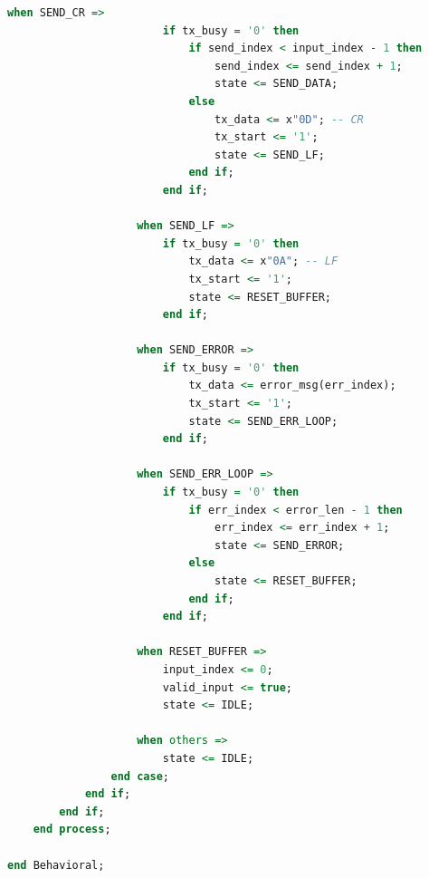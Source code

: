 \documentclass[a4paper,12pt]{article}
\begin{document}
\begin{lstlisting}[language=VHDL, caption={Código completo del módulo UART\_ECHO}, label={lst:uart_echo}]
                    when SEND_CR =>
                        if tx_busy = '0' then
                            if send_index < input_index - 1 then
                                send_index <= send_index + 1;
                                state <= SEND_DATA;
                            else
                                tx_data <= x"0D"; -- CR
                                tx_start <= '1';
                                state <= SEND_LF;
                            end if;
                        end if;

                    when SEND_LF =>
                        if tx_busy = '0' then
                            tx_data <= x"0A"; -- LF
                            tx_start <= '1';
                            state <= RESET_BUFFER;
                        end if;

                    when SEND_ERROR =>
                        if tx_busy = '0' then
                            tx_data <= error_msg(err_index);
                            tx_start <= '1';
                            state <= SEND_ERR_LOOP;
                        end if;

                    when SEND_ERR_LOOP =>
                        if tx_busy = '0' then
                            if err_index < error_len - 1 then
                                err_index <= err_index + 1;
                                state <= SEND_ERROR;
                            else
                                state <= RESET_BUFFER;
                            end if;
                        end if;

                    when RESET_BUFFER =>
                        input_index <= 0;
                        valid_input <= true;
                        state <= IDLE;

                    when others =>
                        state <= IDLE;
                end case;
            end if;
        end if;
    end process;

end Behavioral;
\end{lstlisting}
\end{document}
